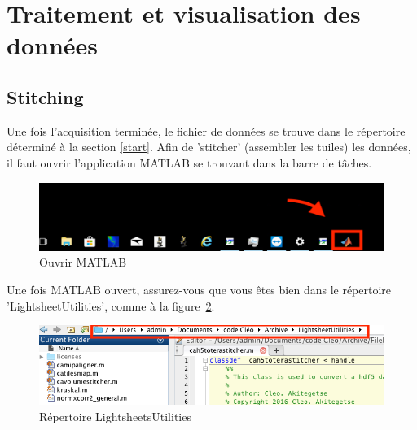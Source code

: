 \section{Traitement et visualisation des données}
\subsection{Stitching}
Une fois l'acquisition terminée, le fichier de données se trouve dans le répertoire déterminé à la section \ref{start}. Afin de 'stitcher' (assembler les tuiles) les données, il faut ouvrir l'application MATLAB se trouvant dans la barre de tâches.


\begin{figure}[H]
    \centering
    \includegraphics[scale = 0.7]{taskbar.png}
    \caption{Ouvrir MATLAB}
    \label{fig:task_bar}
\end{figure}

Une fois MATLAB ouvert, assurez-vous que vous êtes bien dans le répertoire 'LightsheetUtilities', comme à la figure~\ref{fig:repertpoire}.

\begin{figure}[H]
    \centering
    \includegraphics[scale = 0.7]{repertoire.png}
    \caption{Répertoire LightsheetsUtilities}
    \label{fig:repertpoire}
\end{figure}

